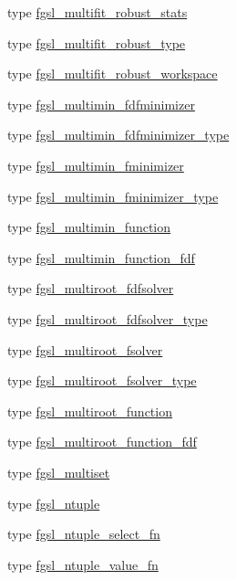 \begin{DoxyCompactItemize}
type \hyperlink{structfgsl_1_1fgsl__multifit__robust__stats}{fgsl\-\_\-multifit\-\_\-robust\-\_\-stats}
\item 
type \hyperlink{structfgsl_1_1fgsl__multifit__robust__type}{fgsl\-\_\-multifit\-\_\-robust\-\_\-type}
\item 
type \hyperlink{structfgsl_1_1fgsl__multifit__robust__workspace}{fgsl\-\_\-multifit\-\_\-robust\-\_\-workspace}
\item 
type \hyperlink{structfgsl_1_1fgsl__multimin__fdfminimizer}{fgsl\-\_\-multimin\-\_\-fdfminimizer}
\item 
type \hyperlink{structfgsl_1_1fgsl__multimin__fdfminimizer__type}{fgsl\-\_\-multimin\-\_\-fdfminimizer\-\_\-type}
\item 
type \hyperlink{structfgsl_1_1fgsl__multimin__fminimizer}{fgsl\-\_\-multimin\-\_\-fminimizer}
\item 
type \hyperlink{structfgsl_1_1fgsl__multimin__fminimizer__type}{fgsl\-\_\-multimin\-\_\-fminimizer\-\_\-type}
\item 
type \hyperlink{structfgsl_1_1fgsl__multimin__function}{fgsl\-\_\-multimin\-\_\-function}
\item 
type \hyperlink{structfgsl_1_1fgsl__multimin__function__fdf}{fgsl\-\_\-multimin\-\_\-function\-\_\-fdf}
\item 
type \hyperlink{structfgsl_1_1fgsl__multiroot__fdfsolver}{fgsl\-\_\-multiroot\-\_\-fdfsolver}
\item 
type \hyperlink{structfgsl_1_1fgsl__multiroot__fdfsolver__type}{fgsl\-\_\-multiroot\-\_\-fdfsolver\-\_\-type}
\item 
type \hyperlink{structfgsl_1_1fgsl__multiroot__fsolver}{fgsl\-\_\-multiroot\-\_\-fsolver}
\item 
type \hyperlink{structfgsl_1_1fgsl__multiroot__fsolver__type}{fgsl\-\_\-multiroot\-\_\-fsolver\-\_\-type}
\item 
type \hyperlink{structfgsl_1_1fgsl__multiroot__function}{fgsl\-\_\-multiroot\-\_\-function}
\item 
type \hyperlink{structfgsl_1_1fgsl__multiroot__function__fdf}{fgsl\-\_\-multiroot\-\_\-function\-\_\-fdf}
\item 
type \hyperlink{structfgsl_1_1fgsl__multiset}{fgsl\-\_\-multiset}
\item 
type \hyperlink{structfgsl_1_1fgsl__ntuple}{fgsl\-\_\-ntuple}
\item 
type \hyperlink{structfgsl_1_1fgsl__ntuple__select__fn}{fgsl\-\_\-ntuple\-\_\-select\-\_\-fn}
\item 
type \hyperlink{structfgsl_1_1fgsl__ntuple__value__fn}{fgsl\-\_\-ntuple\-\_\-value\-\_\-fn}

\end{DoxyCompactItemize}
